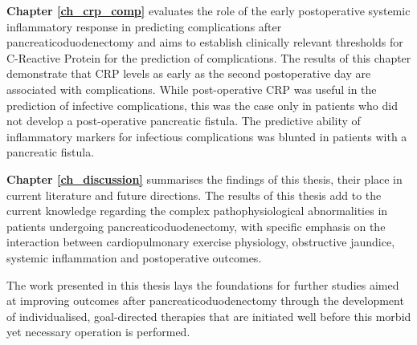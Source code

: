 \documentclass[12pt, oneside]{Thesis} %
\begin{document}
{%

\textbf{Chapter \ref{ch_crp_comp}} evaluates the role of the early postoperative systemic inflammatory response in predicting complications after pancreaticoduodenectomy and aims to establish clinically relevant thresholds for C-Reactive Protein for the prediction of complications. 
The results of this chapter demonstrate that CRP levels as early as the second postoperative day are associated with complications. 
While post-operative CRP was useful in the prediction of infective complications, this was the case only in patients who did not develop a post-operative pancreatic fistula. 
The predictive ability of inflammatory markers for infectious complications was blunted in patients with a pancreatic fistula. 

\textbf{Chapter \ref{ch_discussion}} summarises the findings of this thesis, their place in current literature and future directions. 
The results of this thesis add to the current knowledge regarding the complex pathophysiological abnormalities in patients undergoing pancreaticoduodenectomy, with specific emphasis on the interaction between cardiopulmonary exercise physiology, obstructive jaundice, systemic inflammation and postoperative outcomes. 

The work presented in this thesis lays the foundations for further studies aimed at improving outcomes after pancreaticoduodenectomy through the development of individualised, goal-directed therapies that are initiated well before this morbid yet necessary operation is performed.

}
\end{document}
